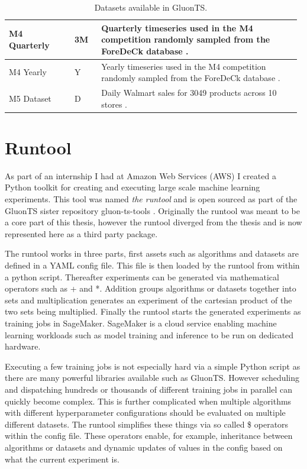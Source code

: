\begin{table}[h]
\begin{tabular}{p{0.22\linewidth} | p{0.09\linewidth} | p{0.67\linewidth}}
        \hline
        M4 Quarterly       & 3M     & Quarterly timeseries used in the M4 competition randomly sampled from the ForeDeCk database \cite{makridakis_m4_2020}.                                                                                                                                            \\
        \hline
        M4 Yearly          & Y      & Yearly timeseries used in the M4 competition randomly sampled from the ForeDeCk database \cite{makridakis_m4_2020}.                                                                                                                                               \\
        \hline
        M5 Dataset         & D      & Daily Walmart sales for 3049 products across 10 stores \cite{gluonts-github, m5}.
    \end{tabular}
    \caption{Datasets available in GluonTS.}
    \label{tab:datasets}
\end{table}
\clearpage
\section{Runtool}
\label{subsec:runtool}

As part of an internship I had at Amazon Web Services (AWS) I created a Python toolkit for creating and executing large scale machine learning experiments. This tool was named \textit{the runtool} and is open sourced as part of the GluonTS sister repository gluon-ts-tools \cite{the_runtool}. Originally the runtool was meant to be a core part of this thesis, however the runtool diverged from the thesis and is now represented here as a third party package.

The runtool works in three parts, first assets such as algorithms and datasets are defined in a YAML config file. This file is then loaded by the runtool from within a python script. Thereafter experiments can be generated via mathematical operators such as + and *. Addition groups algorithms or datasets together into sets and multiplication generates an experiment of the cartesian product of the two sets being multiplied. Finally the runtool starts the generated experiments as training jobs in SageMaker. SageMaker is a cloud service enabling machine learning workloads such as model training and inference to be run on dedicated hardware.

Executing a few training jobs is not especially hard via a simple Python script as there are many powerful libraries available such as GluonTS. However scheduling and dispatching hundreds or thousands of different training jobs in parallel can quickly become complex. This is further complicated when multiple algorithms with different hyperparameter configurations should be evaluated on multiple different datasets. The runtool simplifies these things via so called \$ operators within the config file. These operators enable, for example, inheritance between algorithms or datasets and dynamic updates of values in the config based on what the current experiment is.

